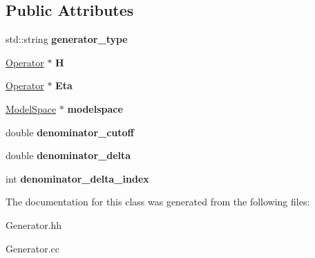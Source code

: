 \subsection*{Public Attributes}
\begin{DoxyCompactItemize}
\item 
\mbox{\label{classGenerator_a0100489ff52a4832dd33fd5837a752d2}} 
std\+::string {\bfseries generator\+\_\+type}
\item 
\mbox{\label{classGenerator_a371ece6c1bad1539c8672bd6f32374dc}} 
\hyperlink{classOperator}{Operator} $\ast$ {\bfseries H}
\item 
\mbox{\label{classGenerator_a2366de6dcf1dce1d046b40f975373e5c}} 
\hyperlink{classOperator}{Operator} $\ast$ {\bfseries Eta}
\item 
\mbox{\label{classGenerator_aefb81881ec5aad1e4e7a0d45957e61d5}} 
\hyperlink{classModelSpace}{Model\+Space} $\ast$ {\bfseries modelspace}
\item 
\mbox{\label{classGenerator_a8a599b6fa41d8804131c59d5f7ca6d3f}} 
double {\bfseries denominator\+\_\+cutoff}
\item 
\mbox{\label{classGenerator_a8b773cbd201fe13bb4a85d46449700fd}} 
double {\bfseries denominator\+\_\+delta}
\item 
\mbox{\label{classGenerator_a1026c528c8d90e61bf9569de59538303}} 
int {\bfseries denominator\+\_\+delta\+\_\+index}
\end{DoxyCompactItemize}


The documentation for this class was generated from the following files\+:\begin{DoxyCompactItemize}
\item 
Generator.\+hh\item 
Generator.\+cc\end{DoxyCompactItemize}
